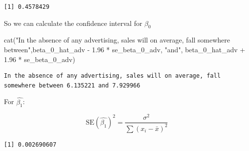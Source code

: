 \documentclass[
  letterpaper,
  DIV=11,
  numbers=noendperiod]{scrreprt}
\newenvironment{Shaded}{\begin{snugshade}}{\end{snugshade}}
\newcommand{\DecValTok}[1]{\textcolor[rgb]{0.68,0.00,0.00}{#1}}
\newcommand{\FloatTok}[1]{\textcolor[rgb]{0.68,0.00,0.00}{#1}}
\newcommand{\FunctionTok}[1]{\textcolor[rgb]{0.28,0.35,0.67}{#1}}
\newcommand{\NormalTok}[1]{\textcolor[rgb]{0.00,0.23,0.31}{#1}}
\newcommand{\OtherTok}[1]{\textcolor[rgb]{0.00,0.23,0.31}{#1}}
\newcommand{\SpecialCharTok}[1]{\textcolor[rgb]{0.37,0.37,0.37}{#1}}
\newcommand{\StringTok}[1]{\textcolor[rgb]{0.13,0.47,0.30}{#1}}
\begin{document}
\begin{verbatim}
[1] 0.4578429
\end{verbatim}

So we can calculate the confidence interval for \(\beta_0\)

\begin{Shaded}
\begin{Highlighting}[]
\FunctionTok{cat}\NormalTok{(}\StringTok{"In the absence of any advertising, sales will on average, fall somewhere between"}\NormalTok{,beta\_0\_hat\_adv }\SpecialCharTok{{-}} \FloatTok{1.96} \SpecialCharTok{*}\NormalTok{ se\_beta\_0\_adv, }\StringTok{"and"}\NormalTok{, beta\_0\_hat\_adv }\SpecialCharTok{+} \FloatTok{1.96} \SpecialCharTok{*}\NormalTok{ se\_beta\_0\_adv)}
\end{Highlighting}
\end{Shaded}

\begin{verbatim}
In the absence of any advertising, sales will on average, fall somewhere between 6.135221 and 7.929966
\end{verbatim}

For \(\hat{\beta_1}\):

\[
\text{SE}(\hat{\beta_1})^2 =\frac{\sigma^2}{\sum(x_i - \bar{x})^2}
\]

\begin{Shaded}
\end{Shaded}

\begin{verbatim}
[1] 0.002690607
\end{verbatim}

\begin{Shaded}
\end{Shaded}
\end{document}
